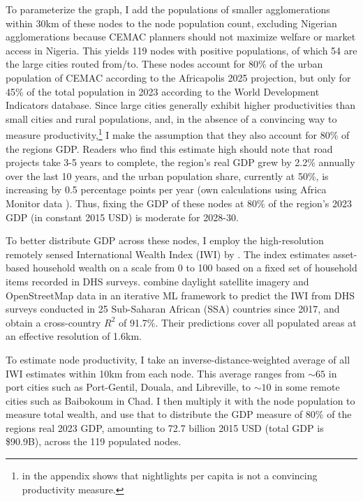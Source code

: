 \documentclass[a4paper]{article}
\begin{document}
To parameterize the graph, I add the populations of smaller agglomerations within 30km of these nodes to the node population count, excluding Nigerian agglomerations because CEMAC planners should not maximize welfare or market access in Nigeria. This yields 119 nodes with positive populations, of which 54 are the large cities routed from/to. These nodes account for 80\% of the urban population of CEMAC according to the Africapolis 2025 projection, but only for 45\% of the total population in 2023 according to the World Development Indicators database. Since large cities generally exhibit higher productivities than small cities and rural populations, and, in the absence of a convincing way to measure productivity,\footnote{\citet{krantz2024optimal} in the appendix shows that nightlights per capita is not a convincing productivity measure. \vspace{-3mm}} I make the assumption that they also account for 80\% of the regions GDP. Readers who find this estimate high should note that road projects take 3-5 years to complete, the region's real GDP grew by 2.2\% annually over the last 10 years, and the urban population share, currently at 50\%, is increasing by 0.5 percentage points per year (own calculations using Africa Monitor data \citep{krantz2024africamonitor}). Thus, fixing the GDP of these nodes at 80\% of the region's 2023 GDP (in constant 2015 USD) is moderate for 2028-30.   \newline 

  To better distribute GDP across these nodes, I employ the high-resolution remotely sensed International Wealth Index (IWI) by \citet{lee2022high}. The index estimates asset-based household wealth on a scale from 0 to 100 based on a fixed set of household items recorded in DHS surveys. \citet{lee2022high} combine daylight satellite imagery and OpenStreetMap data in an iterative ML framework to predict the IWI from DHS surveys conducted in 25 Sub-Saharan African (SSA) countries since 2017, and obtain a cross-country $R^2$ of 91.7\%. Their predictions cover all populated areas at an effective resolution of 1.6km. \newline 
  
  To estimate node productivity, I take an inverse-distance-weighted average of all IWI estimates within 10km from each node. This average ranges from $\sim 65$ in port cities such as Port-Gentil, Douala, and Libreville, to $\sim 10$ in some remote cities such as Baibokoum in Chad. I then multiply it with the node population to measure total wealth, and use that to distribute the GDP measure of 80\% of the regions real 2023 GDP, amounting to 72.7 billion 2015 USD (total GDP is \$90.9B), across the 119 populated nodes. \newline 
  
\end{document}
